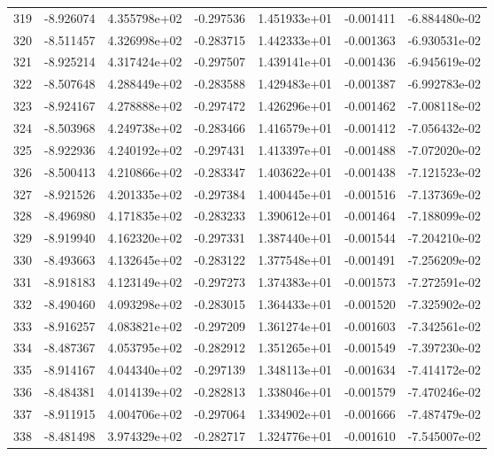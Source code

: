 \begin{tabular}{rrrrrrr}
 319 &  -8.926074 &  4.355798e+02 & -0.297536 &  1.451933e+01 &   -0.001411 & -6.884480e-02 \\
 320 &  -8.511457 &  4.326998e+02 & -0.283715 &  1.442333e+01 &   -0.001363 & -6.930531e-02 \\
 321 &  -8.925214 &  4.317424e+02 & -0.297507 &  1.439141e+01 &   -0.001436 & -6.945619e-02 \\
 322 &  -8.507648 &  4.288449e+02 & -0.283588 &  1.429483e+01 &   -0.001387 & -6.992783e-02 \\
 323 &  -8.924167 &  4.278888e+02 & -0.297472 &  1.426296e+01 &   -0.001462 & -7.008118e-02 \\
 324 &  -8.503968 &  4.249738e+02 & -0.283466 &  1.416579e+01 &   -0.001412 & -7.056432e-02 \\
 325 &  -8.922936 &  4.240192e+02 & -0.297431 &  1.413397e+01 &   -0.001488 & -7.072020e-02 \\
 326 &  -8.500413 &  4.210866e+02 & -0.283347 &  1.403622e+01 &   -0.001438 & -7.121523e-02 \\
 327 &  -8.921526 &  4.201335e+02 & -0.297384 &  1.400445e+01 &   -0.001516 & -7.137369e-02 \\
 328 &  -8.496980 &  4.171835e+02 & -0.283233 &  1.390612e+01 &   -0.001464 & -7.188099e-02 \\
 329 &  -8.919940 &  4.162320e+02 & -0.297331 &  1.387440e+01 &   -0.001544 & -7.204210e-02 \\
 330 &  -8.493663 &  4.132645e+02 & -0.283122 &  1.377548e+01 &   -0.001491 & -7.256209e-02 \\
 331 &  -8.918183 &  4.123149e+02 & -0.297273 &  1.374383e+01 &   -0.001573 & -7.272591e-02 \\
 332 &  -8.490460 &  4.093298e+02 & -0.283015 &  1.364433e+01 &   -0.001520 & -7.325902e-02 \\
 333 &  -8.916257 &  4.083821e+02 & -0.297209 &  1.361274e+01 &   -0.001603 & -7.342561e-02 \\
 334 &  -8.487367 &  4.053795e+02 & -0.282912 &  1.351265e+01 &   -0.001549 & -7.397230e-02 \\
 335 &  -8.914167 &  4.044340e+02 & -0.297139 &  1.348113e+01 &   -0.001634 & -7.414172e-02 \\
 336 &  -8.484381 &  4.014139e+02 & -0.282813 &  1.338046e+01 &   -0.001579 & -7.470246e-02 \\
 337 &  -8.911915 &  4.004706e+02 & -0.297064 &  1.334902e+01 &   -0.001666 & -7.487479e-02 \\
 338 &  -8.481498 &  3.974329e+02 & -0.282717 &  1.324776e+01 &   -0.001610 & -7.545007e-02 \\

\end{tabular}
